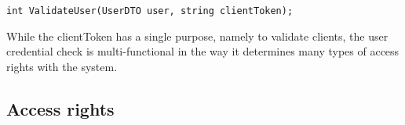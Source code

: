 \documentclass[../report.tex]{subfiles}
\begin{document}
\begin{center}
\texttt{int ValidateUser(UserDTO user, string clientToken);}
\end{center}

While the clientToken has a single purpose, namely to validate clients, the user credential check is multi-functional in the way it determines many types of access rights with the system.


\subsection{Access rights}

\end{document}
